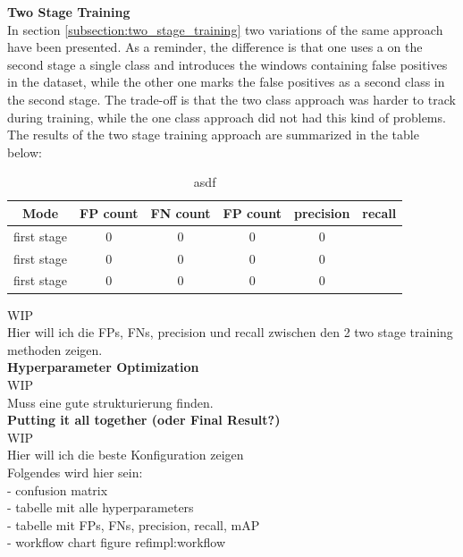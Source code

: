 \textbf{Two Stage Training} \\
In section \ref{subsection:two_stage_training} two variations of the same approach have been presented. As a reminder, the difference is that one uses a on the second stage a single class and introduces the windows containing false positives in the dataset, while the other one marks the false positives as a second class in the second stage. The trade-off is that the two class approach was harder to track during training, while the one class approach did not had this kind of problems.
The results of the two stage training approach are summarized in the table below: \\
\begin{table}
  \centering
    \begin{tabular}{||c|c|c|c|c|c||}
    \hline
    Mode & FP count & FN count & FP count & precision & recall\\ [0.5ex]
    \hline\hline
    first stage & 0 & 0 & 0 & 0 \\
    first stage & 0 & 0 & 0 & 0 \\
    first stage & 0 & 0 & 0 & 0 \\
    \hline
    \end{tabular}
  \caption{asdf}
  \label{impl:two_stage_table}
\end{table}

WIP \\
Hier will ich die FPs, FNs, precision und recall zwischen den 2 two stage training methoden zeigen. \\

\textbf{Hyperparameter Optimization} \\
WIP \\
Muss eine gute strukturierung finden. \\

\textbf{Putting it all together (oder Final Result?)} \\
WIP \\
Hier will ich die beste Konfiguration zeigen \\
Folgendes wird hier sein:\\
  - confusion matrix \\
  - tabelle mit alle hyperparameters \\
  - tabelle mit FPs, FNs, precision, recall, mAP \\
  - workflow chart figure ref{impl:workflow}\\


